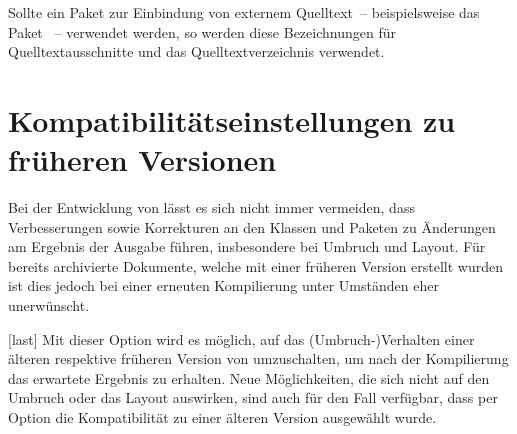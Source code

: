 \begin{Declaration*}{}
\begin{Declaration*}{}
\begin{Declaration*}{}
\begin{Declaration}{}
\begin{Declaration}{}
\printdeclarationlist%
%
Sollte ein Paket zur Einbindung von externem Quelltext~-- beispielsweise 
das Paket ~-- verwendet werden, so werden diese Bezeichnungen 
für Quelltextausschnitte und das Quelltextverzeichnis verwendet.
%
\end{Declaration}
\end{Declaration}

\section{Kompatibilitätseinstellungen zu früheren Versionen}
Bei der Entwicklung von \TUDScript lässt es sich nicht immer vermeiden, dass 
Verbesserungen sowie Korrekturen an den Klassen und Paketen zu Änderungen am 
Ergebnis der Ausgabe führen, insbesondere bei Umbruch und Layout. Für bereits
archivierte Dokumente, welche mit einer früheren Version erstellt wurden ist 
dies jedoch bei einer erneuten Kompilierung unter Umständen eher unerwünscht.

\begin{Declaration}[v2.03]{}[last]
\printdeclarationlist%
%
%
Mit dieser Option wird es möglich, auf das (Umbruch-)Verhalten einer älteren 
respektive früheren Version von \TUDScript umzuschalten, um nach der 
Kompilierung das erwartete Ergebnis zu erhalten. Neue Möglichkeiten, die sich 
nicht auf den Umbruch oder das Layout auswirken, sind auch für den Fall 
verfügbar, dass per Option die Kompatibilität zu einer älteren Version 
ausgewählt wurde. 


\end{Declaration}
\end{Declaration*}
\end{Declaration*}
\end{Declaration*}
